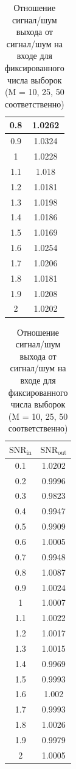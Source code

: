 \documentclass[12pt, a4paper] {ncc}
\begin{document}
\begin{table}[H]
\begin{tabular} { |c|c| }
						0.8 &  1.0262 \\ \hline
						0.9 &  1.0324 \\ \hline
						1   &  1.0228 \\ \hline
						1.1 &  1.018 \\ \hline
						1.2 &  1.0181 \\ \hline
						1.3 &  1.0198 \\ \hline
						1.4 &  1.0186 \\ \hline
						1.5 &  1.0169 \\ \hline
						1.6 &  1.0254 \\ \hline
						1.7 &  1.0206 \\ \hline
						1.8 &  1.0181 \\ \hline
						1.9 &  1.0208 \\ \hline
						2   &  1.0202 \\ \hline
			\end{tabular}
            \begin{tabular} { |c|c| }
                \hline
					$\text{SNR}_\text{in}$ & $\text{SNR}_\text{out}$ \\ \hline
                            0.1 &  1.0202 \\ \hline
                            0.2 &  0.9996 \\ \hline
                            0.3 &  0.9823 \\ \hline
                            0.4 &  0.9947 \\ \hline
                            0.5 &  0.9909 \\ \hline
                            0.6 &  1.0005 \\ \hline
                            0.7 &  0.9948 \\ \hline
                            0.8 &  1.0087 \\ \hline
                            0.9 &  1.0024 \\ \hline
                            1   &  1.0007 \\ \hline
                            1.1 &  1.0022 \\ \hline
                            1.2 &  1.0017 \\ \hline
                            1.3 &  1.0015 \\ \hline
                            1.4 &  0.9969 \\ \hline
                            1.5 &  0.9993 \\ \hline
                            1.6 &  1.002 \\ \hline
                            1.7 &  0.9993 \\ \hline
                            1.8 &  1.0026 \\ \hline
                            1.9 &  0.9979 \\ \hline
                            2   &  1.0005 \\ \hline
			\end{tabular}
            \caption{Отношение сигнал/шум выхода от сигнал/шум на входе для фиксированного числа выборок (M = 10, 25, 50 соответственно)}
		\end{table}
\end{document}
